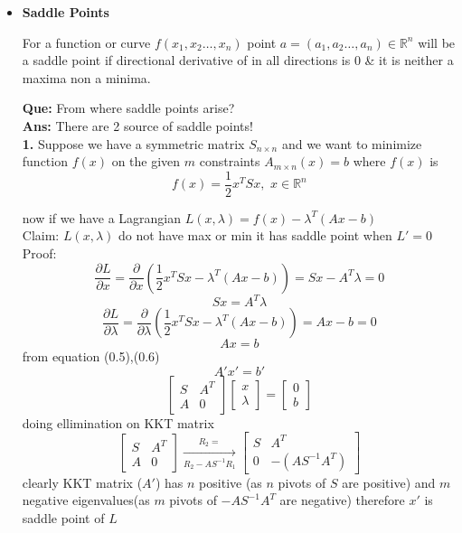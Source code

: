 \documentclass[a4paper]{article}
\numberwithin{equation}{section}
\begin{document}
\begin{itemize}
\item \textbf{Saddle Points} 

For a function or curve $f(x_1,x_2\dots,x_n)$ point $a=(a_1,a_2\dots,a_n)\in \mathbb{R}^n$ will be a saddle point if directional derivative of in all directions is 0 \& it is neither a maxima non a minima.

\textbf{Que: }From where saddle points arise?\\
\textbf{Ans: }There are 2 source of saddle points!\\

\textbf{1.} Suppose we have a symmetric matrix $S_{n\times n}$ and we want to minimize function $f(x)$ on the given $m$ constraints $A_{m\times n}(x)=b$ where $f(x)$ is
\[f(x)=\frac{1}{2}x^TSx ,\hspace{4pt} x\in \mathbb{R}^n \]

now if we have a Lagrangian $L(x,\lambda) =f(x)-\lambda^T(Ax-b)$\\

Claim: $L(x,\lambda)$ do not have max or min it has saddle point when $L'=0$\\

Proof: 
\[\frac{\partial L}{\partial x}=\frac{\partial }{\partial x}\left(\frac{1}{2}x^TSx-\lambda^T(Ax-b)\right)=Sx-A^T\lambda=0\]
\begin{equation}
    Sx=A^T\lambda
\end{equation}
\[\frac{\partial L}{\partial \lambda}=\frac{\partial }{\partial \lambda}\left(\frac{1}{2}x^TSx-\lambda^T(Ax-b)\right)=Ax-b=0\]
\begin{equation}
    Ax=b
\end{equation}
from equation (0.5),(0.6)
\[A'x'=b'\]
\begin{equation}
    \begin{bmatrix}
        S&A^T\\A&0
    \end{bmatrix} 
    \begin{bmatrix}
        x\\\lambda
    \end{bmatrix}=
    \begin{bmatrix}
        0\\b
    \end{bmatrix} \tag{KKT}
\end{equation}
doing ellimination on KKT matrix\\

\[
\begin{bmatrix}
    S&A^T\\A&0
\end{bmatrix}\xrightarrow[R_2-AS^{-1}R_1]{R_2=}
\begin{bmatrix}
    S&A^T\\0&-(AS^{-1}A^T)
\end{bmatrix}
\]
clearly KKT matrix ($A'$) has $n$ positive (as $n$ pivots of $S$ are positive) and $m$ negative eigenvalues(as $m$ pivots of $-AS^{-1}A^T$ are negative) therefore $x'$ is saddle point of $L$\\


\end{itemize}
\end{document}
